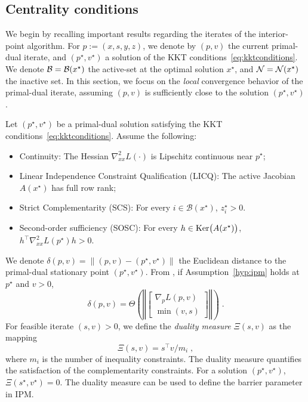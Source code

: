 \subsection{Centrality conditions}
We begin by recalling important results regarding the iterates of the interior-point algorithm.
For $p := (x, s, y, z)$, we denote by
$(p, v)$ the current primal-dual iterate,
and $(p^\star, v^\star)$ a solution of the KKT conditions~\eqref{eq:kktconditions}.
We denote $\mathcal{B} = \mathcal{B}(x^\star)$ the active-set at the optimal solution $x^\star$,
and $\mathcal{N} = \mathcal{N}(x^\star)$ the inactive set.
In this section, we focus on the \emph{local} convergence behavior of the
primal-dual iterate, assuming $(p, v)$ is sufficiently close to the solution
$(p^\star, v^\star)$.

\begin{assumption}
  \label{hyp:ipm}
  Let $(p^\star, v^\star)$ be a primal-dual solution
  satisfying the KKT conditions~\eqref{eq:kktconditions}. Assume the following:
  \begin{itemize}
  \item Continuity: The Hessian $\nabla^2_{x x} L(\cdot)$ is Lipschitz continuous
    near $p^\star$;
  \item Linear Independence Constraint Qualification (LICQ): The active Jacobian $A(x^\star)$ has full row rank;
  \item Strict Complementarity (SCS): For every $i \in \mathcal{B}(x^\star)$, $z_i^\star > 0$.
  \item Second-order sufficiency (SOSC): For every $h \in \operatorname{Ker}\!\big(A(x^\star)\big)$,
    $h^\top \nabla_{x x}^2 L(p^\star)h > 0$.
  \end{itemize}
\end{assumption}

We denote $\delta(p, v) = \| (p, v) - (p^\star, v^\star) \|$ the Euclidean distance to the
primal-dual stationary point $(p^\star, v^\star)$.
From \cite[Theorem 2.2]{wright2001effects}, if Assumption~\ref{hyp:ipm}
holds at $p^\star$ and $v > 0$,
\begin{equation}
  \delta(p, v) = \Theta\left( \left\Vert \begin{bmatrix}
      \nabla_p L(p, v) \\ \min(v, s)
  \end{bmatrix}
  \right\Vert \right) \; .
\end{equation}
For feasible iterate $(s, v) > 0$, we define the \emph{duality measure} $\Xi(s, v)$ as the mapping
\begin{equation}
  \Xi(s, v) = s^\top v / m_i \; , %
\end{equation}
where $m_i$ is the number of inequality constraints.
The duality measure quantifies the satisfaction of the complementarity
constraints. For a solution $(p^\star, v^\star)$, $\Xi(s^\star, v^\star) = 0$.
The duality measure can be used to define the barrier parameter in IPM.

